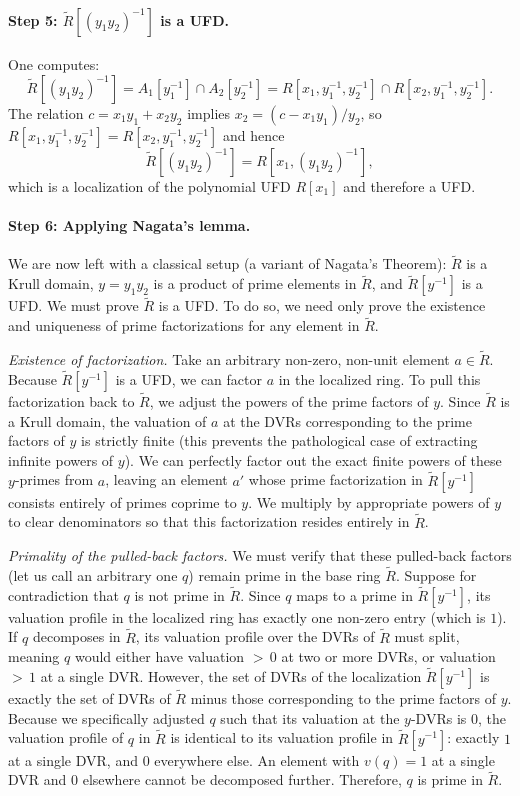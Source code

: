 \documentclass[]{pkuai4m}
\theoremstyle{plain}
\theoremstyle{definition}
\begin{document}
\paragraph{Step 5: $\tilde{R}[(y_1 y_2)^{-1}]$ is a UFD.} One computes:
\[
\tilde{R}[(y_1 y_2)^{-1}] = A_1[y_1^{-1}] \cap A_2[y_2^{-1}] = R[x_1, y_1^{-1}, y_2^{-1}] \cap R[x_2, y_1^{-1}, y_2^{-1}].
\]
The relation $c = x_1 y_1 + x_2 y_2$ implies $x_2 = (c - x_1 y_1)/y_2$, so $R[x_1, y_1^{-1}, y_2^{-1}] = R[x_2, y_1^{-1}, y_2^{-1}]$ and hence
\[
\tilde{R}[(y_1 y_2)^{-1}] = R[x_1, (y_1 y_2)^{-1}],
\]
which is a localization of the polynomial UFD $R[x_1]$ and therefore a UFD.

\paragraph{Step 6: Applying Nagata's lemma.} We are now left with a classical setup (a variant of Nagata's Theorem): $\tilde{R}$ is a Krull domain, $y = y_1 y_2$ is a product of prime elements in $\tilde{R}$, and $\tilde{R}[y^{-1}]$ is a UFD. We must prove $\tilde{R}$ is a UFD. To do so, we need only prove the existence and uniqueness of prime factorizations for any element in $\tilde{R}$.

\emph{Existence of factorization.} Take an arbitrary non-zero, non-unit element $a \in \tilde{R}$. Because $\tilde{R}[y^{-1}]$ is a UFD, we can factor $a$ in the localized ring. To pull this factorization back to $\tilde{R}$, we adjust the powers of the prime factors of $y$. Since $\tilde{R}$ is a Krull domain, the valuation of $a$ at the DVRs corresponding to the prime factors of $y$ is strictly finite (this prevents the pathological case of extracting infinite powers of $y$). We can perfectly factor out the exact finite powers of these $y$-primes from $a$, leaving an element $a'$ whose prime factorization in $\tilde{R}[y^{-1}]$ consists entirely of primes coprime to $y$. We multiply by appropriate powers of $y$ to clear denominators so that this factorization resides entirely in $\tilde{R}$.

\emph{Primality of the pulled-back factors.} We must verify that these pulled-back factors (let us call an arbitrary one $q$) remain prime in the base ring $\tilde{R}$. Suppose for contradiction that $q$ is not prime in $\tilde{R}$. Since $q$ maps to a prime in $\tilde{R}[y^{-1}]$, its valuation profile in the localized ring has exactly one non-zero entry (which is $1$). If $q$ decomposes in $\tilde{R}$, its valuation profile over the DVRs of $\tilde{R}$ must split, meaning $q$ would either have valuation ${>}\,0$ at two or more DVRs, or valuation ${>}\,1$ at a single DVR. However, the set of DVRs of the localization $\tilde{R}[y^{-1}]$ is exactly the set of DVRs of $\tilde{R}$ minus those corresponding to the prime factors of $y$. Because we specifically adjusted $q$ such that its valuation at the $y$-DVRs is $0$, the valuation profile of $q$ in $\tilde{R}$ is identical to its valuation profile in $\tilde{R}[y^{-1}]$: exactly $1$ at a single DVR, and $0$ everywhere else. An element with $v(q) = 1$ at a single DVR and $0$ elsewhere cannot be decomposed further. Therefore, $q$ is prime in $\tilde{R}$.
\end{document}
